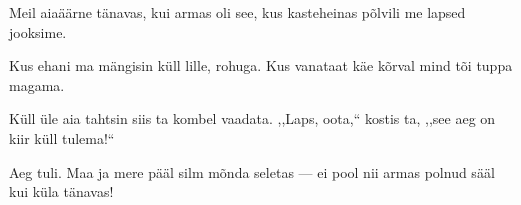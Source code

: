 Meil aia\"a\"arne t\"anavas,
kui armas oli see,
kus kasteheinas p\~olvili
me lapsed jooksime.

Kus ehani ma m\"angisin
k\"ull lille, rohuga.
Kus vanataat k\"ae k\~orval mind
t\~oi tuppa magama.

K\"ull \"ule aia tahtsin siis
ta kombel vaadata.
{,,}Laps, oota,{``} kostis ta, {,,}see aeg
on kiir k\"ull tulema!{``}

Aeg tuli. Maa ja mere p\"a\"al
silm m\~onda seletas ---
ei pool nii armas polnud s\"a\"al 
kui k\"ula t\"anavas!